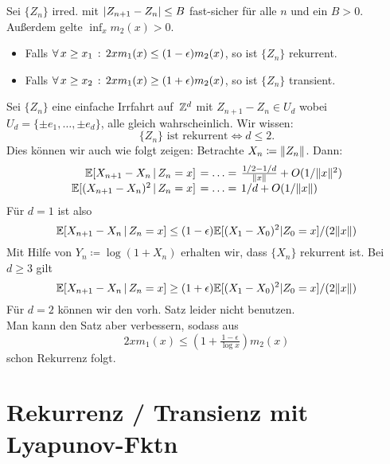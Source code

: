 \documentclass{cheat-sheet}
\newcommand{\E}{\mathbb{E}} %
\begin{document}
\begin{satz}
  Sei $\{ Z_n \}$ irred. mit
  $\lvert Z_{n+1} - Z_n\rvert \leq B$ fast-sicher für alle $n$ und ein $B > 0$.
  Außerdem gelte ${\inf}_{x} m_2(x) > 0$.
  \begin{itemize}
    \item Falls $\forall \, {x \geq x_1} \,:\, 2 x m_1(x) \leq (1-\epsilon) m_2(x)$, so ist $\{ Z_n \}$ rekurrent.
    \item Falls $\forall \, {x \geq x_2} \,:\, 2 x m_1(x) \geq (1 + \epsilon) m_2(x)$, so ist $\{ Z_n \}$ transient.
  \end{itemize}
\end{satz}


\begin{bsp}
  Sei $\{ Z_n \}$ eine einfache Irrfahrt auf~$\mathbb{Z}^d$ mit
  $Z_{n+1} - Z_n \in U_d$ wobei $U_d = \{ \pm e_1, \ldots, \pm e_d \}$, alle gleich wahrscheinlich.
  Wir wissen:
  \[
    \{ Z_n \} \text{ ist rekurrent} \iff d \leq 2.
  \]
  Dies können wir auch wie folgt zeigen:
  Betrachte $X_n \coloneqq \lVert Z_n\rVert$.
  Dann:
  \[
    \arraycolsep=2pt
    \begin{array}{r l l}
      \E[ X_{n+1} - X_n \,|\, Z_n = x ] & = \ldots = & \tfrac{1/2 - 1/d}{\norm{x}} + O(1 / \norm{x}^2) \\
      \E[ (X_{n+1} - X_n)^2 \,|\, Z_n = x ] & = \ldots = & 1/d + O(1 / \norm{x})
    \end{array}
  \]
  Für $d = 1$ ist also
  \[ \E[ X_{n+1} - X_n \,|\, Z_n = x ] \leq (1-\epsilon) \E[ (X_1 - X_0)^2 | Z_0 = x ] / (2 \norm{x}) \]
  Mit Hilfe von $Y_n \coloneqq \log(1 + X_n)$ erhalten wir, dass $\{ X_n \}$ rekurrent ist.
  Bei $d \geq 3$ gilt
  \[ \E[ X_{n+1} - X_n \,|\, Z_n = x ] \geq (1+\epsilon) \E[ (X_1 - X_0)^2 | Z_0 = x ] / (2 \norm{x}) \]
  Für $d = 2$ können wir den vorh. Satz leider nicht benutzen. \\
  Man kann den Satz aber verbessern, sodass aus
  \[ 2 x m_1(x) \leq (1 + \tfrac{1-\epsilon}{\log x}) m_2(x) \]
  schon Rekurrenz folgt.
\end{bsp}

\columnbreak

\section{Rekurrenz / Transienz mit Lyapunov-Fktn}
\end{document}
